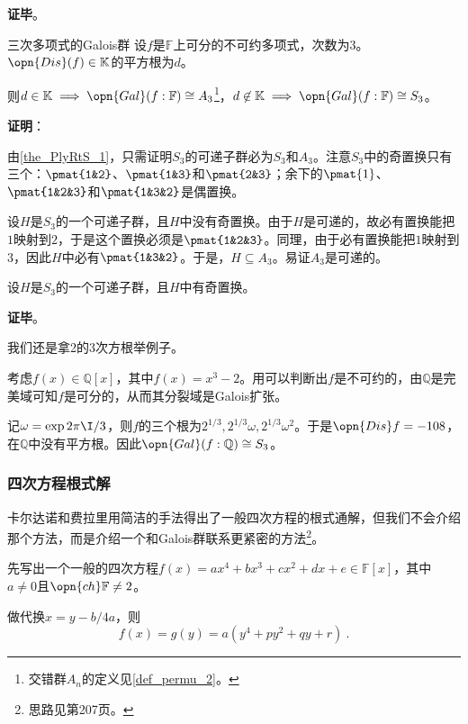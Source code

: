 \textbf{证毕}。


\begin{corollary}{三次多项式的Galois群}\label{cor_PlyRtS_1}
设$f$是$\mathbb{F}$上可分的不可约多项式，次数为$3$。$\opn{Dis}(f)\in\mathbb{K}$的平方根为$d$。

则$d\in\mathbb{K}\implies\opn{Gal}(f:\mathbb{F})\cong A_3$\footnote{交错群$A_n$的定义见\autoref{def_permu_2}。}，$d\not\in\mathbb{K}\implies\opn{Gal}(f:\mathbb{F})\cong S_3$。
\end{corollary}

\textbf{证明}：

由\autoref{the_PlyRtS_1}，只需证明$S_3$的可递子群必为$S_3$和$A_3$。注意$S_3$中的奇置换只有三个：$\pmat{1&2}$、$\pmat{1&3}$和$\pmat{2&3}$；余下的$\pmat{1}$、$\pmat{1&2&3}$和$\pmat{1&3&2}$是偶置换。

设$H$是$S_3$的一个可递子群，且$H$中没有奇置换。由于$H$是可递的，故必有置换能把$1$映射到$2$，于是这个置换必须是$\pmat{1&2&3}$。同理，由于必有置换能把$1$映射到$3$，因此$H$中必有$\pmat{1&3&2}$。于是，$H\subseteq A_3$。易证$A_3$是可递的。

设$H$是$S_3$的一个可递子群，且$H$中有奇置换。

\textbf{证毕}。

\begin{example}{}
我们还是拿2的3次方根举例子。

考虑$f(x)\in\mathbb{Q}[x]$，其中$f(x)=x^3-2$。用可以判断出$f$是不可约的，由$\mathbb{Q}$是完美域可知$f$是可分的，从而其分裂域是Galois扩张。

记$\omega=\exp{2\pi\I/3}$，则$f$的三个根为$2^{1/3}, 2^{1/3}\omega, 2^{1/3}\omega^2$。于是$\opn{Dis}f=-108$，在$\mathbb{Q}$中没有平方根。因此$\opn{Gal}(f:\mathbb{Q})\cong S_3$。
\end{example}




\subsubsection{四次方程根式解}

卡尔达诺和费拉里用简洁的手法得出了一般四次方程的根式通解，但我们不会介绍那个方法，而是介绍一个和Galois群联系更紧密的方法\footnote{思路见\cite{GTM242}第207页。}。

先写出一个一般的四次方程$f(x)=ax^4+bx^3+cx^2+dx+e\in\mathbb{F}[x]$，其中$a\neq 0$且$\opn{ch}\mathbb{F}\neq 2$。

做代换$x=y-b/4a$，则
\begin{equation}\label{eq_PlyRtS_6}
f(x) = g(y) = a(y^4+py^2+qy+r)~.
\end{equation}

